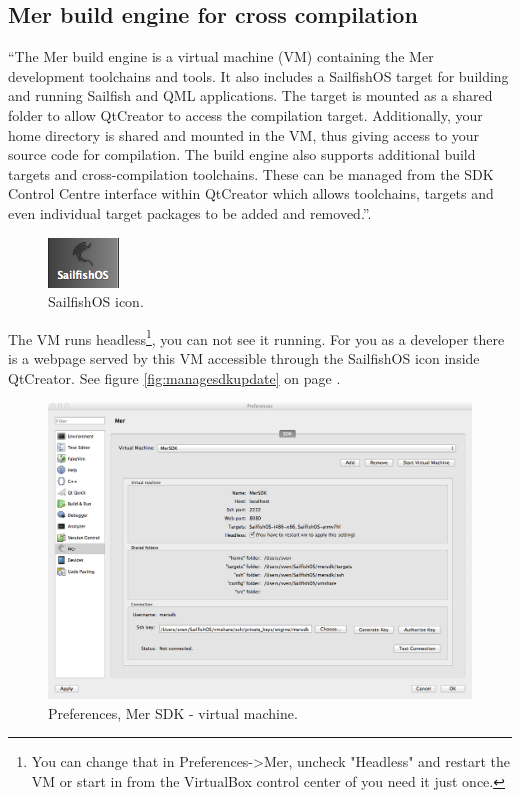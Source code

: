 \subsection{Mer build engine for cross compilation}\label{subsec:MerSDK}
%
``The Mer build engine is a virtual machine (VM) containing the Mer development toolchains and tools. It also includes a SailfishOS target for building and running Sailfish and QML applications. The target is mounted as a shared folder to allow QtCreator to access the compilation target. Additionally, your home directory is shared and mounted in the VM, thus giving access to your source code for compilation.
The build engine also supports additional build targets and cross-compilation toolchains. These can be managed from the SDK Control Centre interface within QtCreator which allows toolchains, targets and even individual target packages to be added and removed.''\cite{sailfishos3}.
%
\begin{figure}[H]
  \centering
  \includegraphics[scale=0.5]{../media/gfx/QtCreator/MerSDKsettings.png} 
  \caption{SailfishOS icon.}
  \label{fig:creatormersdkicon}
\end{figure}
%
The VM runs headless\footnote{You can change that in Preferences->Mer, uncheck "Headless" and restart the VM or start in from the VirtualBox control center of you need it just once.}, you can not see it running. For you as a developer there is a webpage served by this VM accessible through the SailfishOS icon inside QtCreator. See figure \ref{fig:managesdkupdate} on page \pageref{fig:managesdkupdate}.
%
\begin{figure}[H]
  \centering
  \includegraphics[scale=0.3]{../media/gfx/QtCreator/MerSDK.png} 
  \caption{Preferences, Mer SDK - virtual machine.}
  \label{fig:creatormersdk}
\end{figure}
%
%
